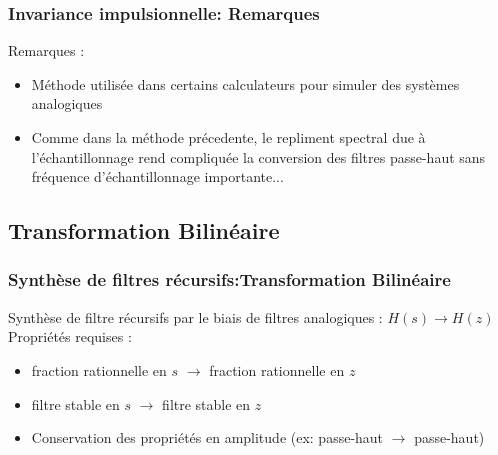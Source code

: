 \documentclass{beamer}
\begin{document}
\begin{frame}
\frametitle{Invariance impulsionnelle: Remarques} 

\begin{center}
\end{center}
\vspace{0.1cm}
Remarques :
\vspace{0.1cm}
\begin{itemize}
\item<2-> Méthode utilisée dans certains calculateurs pour simuler des systèmes analogiques
\vspace{0.3cm} 
\item<3-> Comme dans la méthode précedente, le repliment spectral due à l'échantillonnage  rend compliquée la conversion des filtres passe-haut sans fréquence d'échantillonnage importante...

\end{itemize}
\end{frame}

\subsection{Transformation Bilinéaire}
\begin{frame}
\frametitle{Synthèse de filtres récursifs:Transformation Bilinéaire} 
Synthèse de filtre récursifs par le biais de filtres analogiques :  $H(s) \rightarrow H(z)$\\
Propriétés requises : \\
\begin{itemize}
\item<2-> fraction rationnelle en $s$ $\rightarrow$ fraction rationnelle en $z$
\vspace{0.5cm}
\item<3-> filtre stable en  $s$ $\rightarrow$ filtre stable en  $z$
\vspace{0.5cm}
\item<4-> Conservation des propriétés en amplitude (ex: passe-haut $\rightarrow$ passe-haut)
\end{itemize}
\end{frame}
\end{document}

